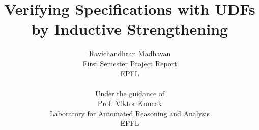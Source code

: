 \documentclass[a4paper,10pt]{report}
\theoremstyle{definition} \newtheorem{definition}{Definition}
\begin{document}
\title{Verifying Specifications with UDFs by Inductive Strengthening}
\author{Ravichandhran Madhavan \\ First Semester Project Report \\ EPFL \\ \\
Under the guidance of \\
Prof. Viktor Kuncak \\ 
Laboratory for Automated Reasoning and Analysis \\ EPFL}
\maketitle






%

\end{document}
